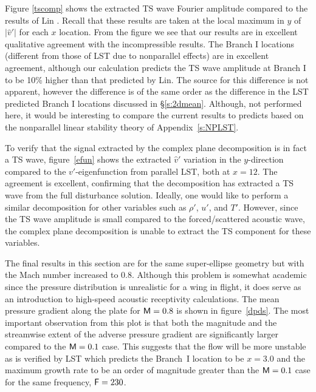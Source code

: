 Figure \ref{tscomp} shows the extracted TS wave Fourier amplitude compared to
the results of Lin \cite{Lin:92}.  Recall that these results are taken at the
local maximum in $y$ of $|\hat v'|$ for each $x$ location.  From the figure we
see that our results are in excellent qualitative agreement with the
incompressible results.  The Branch I locations (different from those of LST
due to nonparallel effects) are in excellent agreement, although our
calculation predicts the TS wave amplitude at Branch I to be 10\% higher than
that predicted by Lin.  The source for this difference is not apparent,
however the difference is of the same order as the difference in the LST
predicted Branch I locations discussed in \S\ref{s:2dmean}.  Although, not
performed here, it would be interesting to compare the current results to
predicts based on the nonparallel linear stability theory of
Appendix~\ref{s:NPLST}.

To verify that the signal extracted by the complex plane decomposition is in
fact a TS wave, figure~\ref{efun} shows the extracted $\hat v'$ variation in
the $y$-direction compared to the $v'$-eigenfunction from parallel LST, both
at $x=12$.  The agreement is excellent, confirming that the decomposition has
extracted a TS wave from the full disturbance solution.  Ideally, one would
like to perform a similar decomposition for other variables such as $\rho'$,
$u'$, and $T'$.  However, since the TS wave amplitude is small compared to the
forced/scattered acoustic wave, the complex plane decomposition is unable to
extract the TS component for these variables.

The final results in this section are for the same super-ellipse geometry but
with the Mach number increased to 0.8.  Although this problem is somewhat
academic since the pressure distribution is unrealistic for a wing in flight,
it does serve as an introduction to high-speed acoustic receptivity
calculations.  The mean pressure gradient along the plate for ${\sf M}=0.8$ is
shown in figure~\ref{dpds}.  The most important observation from this plot is
that both the magnitude and the streamwise extent of the adverse pressure
gradient are significantly larger compared to the ${\sf M}=0.1$ case.  This
suggests that the flow will be more unstable as is verified by LST which
predicts the Branch~I location to be $x=3.0$ and the maximum growth rate to be
an order of magnitude greater than the ${\sf M}=0.1$ case for the same frequency,
${\sf F}=230$.


